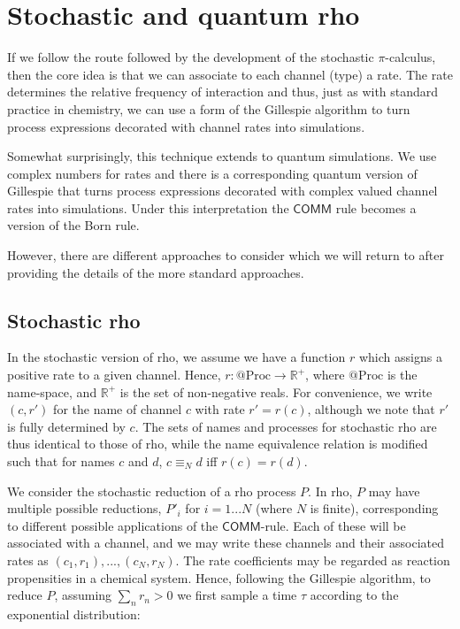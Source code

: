 \section{Stochastic and quantum rho}

If we follow the route followed by the development of the stochastic
$\pi$-calculus, then the core idea is that we can associate to each
channel (type) a rate. The rate determines the relative frequency of
interaction and thus, just as with standard practice in chemistry, we
can use a form of the Gillespie algorithm to turn process expressions
decorated with channel rates into simulations.

Somewhat surprisingly, this technique extends to quantum
simulations. We use complex numbers for rates and there is a
corresponding quantum version of Gillespie that turns process
expressions decorated with complex valued channel rates into
simulations. Under this interpretation the $\mathsf{COMM}$ rule becomes
a version of the Born rule.

However, there are different approaches to consider which we will
return to after providing the details of the more standard approaches.

\subsection{Stochastic rho}

In the stochastic version of rho, we assume we have a function $r$ which assigns a positive rate to a given channel.  Hence, $r: @\text{Proc} \rightarrow \mathbb{R}^+$, where $@\text{Proc}$ is the name-space, and $\mathbb{R}^+$ is the set of non-negative reals.  For convenience, we write $(c,r')$ for the name of channel $c$ with rate $r'=r(c)$, although we note that $r'$ is fully determined by $c$.  The sets of names and processes for stochastic rho are thus identical to those of rho, while the name equivalence relation is modified such that for names $c$ and $d$, $c\equiv_N d$ iff $r(c)=r(d)$.

We consider the stochastic reduction of a rho process $P$.  In rho, $P$ may have multiple possible reductions, $P'_i$ for $i=1...N$ (where $N$ is finite), corresponding to different possible applications of the $\mathsf{COMM}$-rule.  Each of these will be associated with a channel, and we may write these channels and their associated rates as $(c_1,r_1),...,(c_N,r_N)$.  The rate coefficients may be regarded as reaction propensities in a chemical system.  Hence, following the Gillespie algorithm, to reduce $P$, assuming $\sum_n r_n > 0$ we first sample a time $\tau$ according to the exponential distribution:

